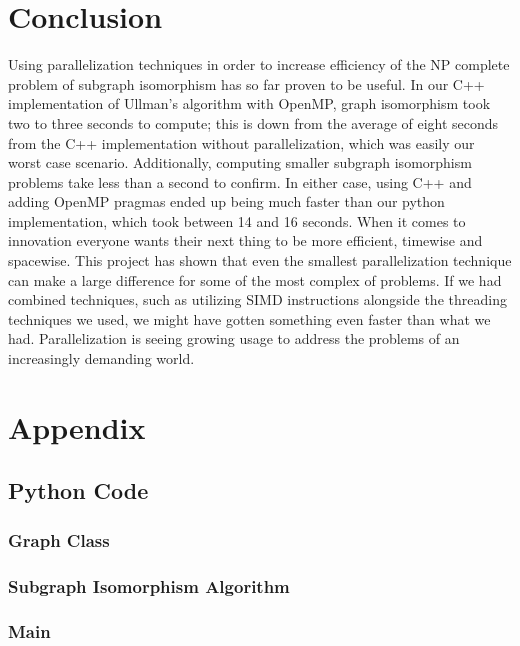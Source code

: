 \documentclass{article}
\begin{document}
\section{Conclusion}
  Using parallelization techniques in order to increase efficiency of the NP complete problem of subgraph isomorphism has so far proven to be useful. In our C++ implementation of Ullman's algorithm with OpenMP, graph isomorphism took two to three seconds to compute; this is down from the average of eight seconds from the C++ implementation without parallelization, which was easily our worst case scenario. Additionally, computing smaller subgraph isomorphism problems take less than a second to confirm. In either case, using C++ and adding OpenMP pragmas ended up being much faster than our python implementation, which took between 14 and 16 seconds. When it comes to innovation everyone wants their next thing to be more efficient, timewise and spacewise.  This project has shown that even the smallest parallelization technique can make a large difference  for some of the most complex of problems. If we had combined techniques, such as utilizing SIMD instructions alongside the threading techniques we used, we might have gotten something even faster than what we had. Parallelization is seeing growing usage to address the problems of an increasingly demanding world.

\section{Appendix}
  \subsection{Python Code}
    \subsubsection{Graph Class}
      
    \subsubsection{Subgraph Isomorphism Algorithm}
      
    \subsubsection{Main}
      
\end{document}
